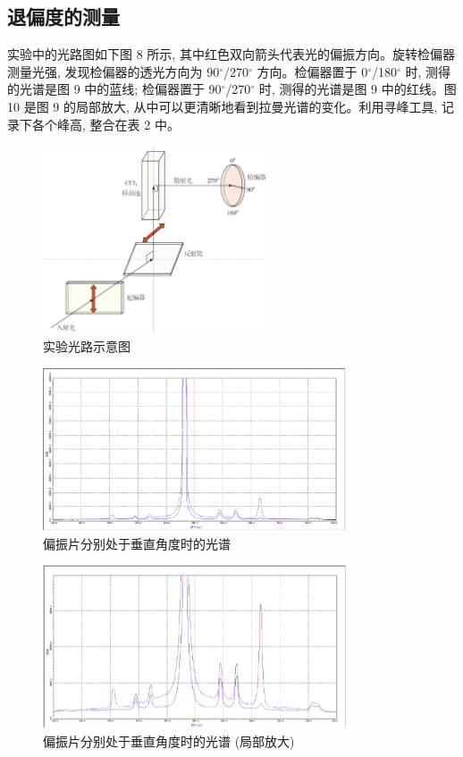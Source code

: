 \documentclass{article}
\begin{document}
\subsection{退偏度的测量}

实验中的光路图如下图 8 所示, 其中红色双向箭头代表光的偏振方向。旋转检偏器测量光强, 发现检偏器的透光方向为 90$^\circ$/270$^\circ$ 方向。检偏器置于 0$^\circ$/180$^\circ$ 时, 测得的光谱是图 9 中的蓝线; 检偏器置于 90$^\circ$/270$^\circ$ 时, 测得的光谱是图 9 中的红线。图 10 是图 9 的局部放大, 从中可以更清晰地看到拉曼光谱的变化。利用寻峰工具, 记录下各个峰高, 整合在表 2 中。

\begin{figure}[h]
    \centering
    \includegraphics[width=0.6\textwidth]{图片 8.png} %
    \caption{实验光路示意图}
    \label{fig:setup}
\end{figure}

\begin{figure}[h]
    \centering
    \includegraphics[width=0.8\textwidth]{图片 9.png} %
    \caption{偏振片分别处于垂直角度时的光谱}
    \label{fig:polarization_spectra}
\end{figure}

\begin{figure}[h]
    \centering
    \includegraphics[width=0.8\textwidth]{图片 10.png} %
    \caption{偏振片分别处于垂直角度时的光谱 (局部放大)}
    \label{fig:polarization_spectra_zoom}
\end{figure}
\end{document}
